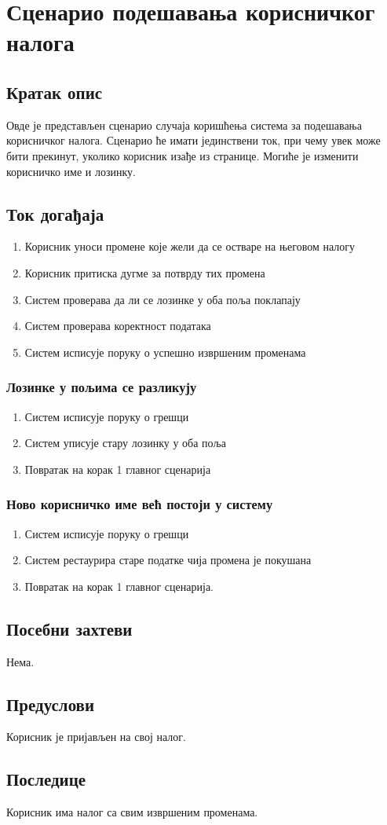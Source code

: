 \section{Сценарио подешавања корисничког налога}

\subsection{Кратак опис}
Овде је представљен сценарио случаја коришћења система за подешавања корисничког налога.
Сценарио ће имати јединствени ток, при чему увек може бити прекинут, уколико корисник изађе из
странице. Могиће је изменити корисничко име и лозинку.

\subsection{Ток догађаја}
\begin{enumerate}
	\item Корисник уноси промене које жели да се остваре на његовом налогу
	\item Корисник притиска дугме за потврду тих промена
	\item Систем проверава да ли се лозинке у оба поља поклапају
	\item Систем проверава коректност података
	\item Систем исписује поруку о успешно извршеним променама
\end{enumerate}

\subsubsection{Лозинке у пољима се разликују}
\begin{enumerate}[label=4.\arabic*]
	\item Систем исписује поруку о грешци
	\item Систем уписује стару лозинку у оба поља
	\item Повратак на корак 1 главног сценарија
\end{enumerate}

\subsubsection{Ново корисничко име већ постоји у систему}
\begin{enumerate}[label=5.\arabic*]
	\item Систем исписује поруку о грешци
	\item Систем рестаурира старе податке чија промена је покушана
	\item Повратак на корак 1 главног сценарија.
\end{enumerate}

\subsection{Посебни захтеви}
Нема.

\subsection{Предуслови}
Корисник је пријављен на свој налог.

\subsection{Последице}
Корисник има налог са свим извршеним променама.
